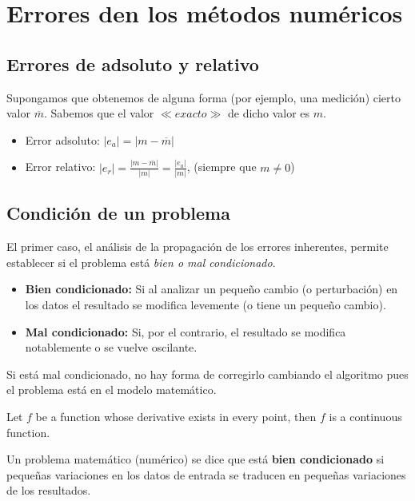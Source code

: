 \documentclass[../main.tex]{subfiles}
\begin{document}
\section{Errores den los métodos numéricos} 
    \subsection{Errores de adsoluto y relativo}
    Supongamos que obtenemos de alguna forma (por ejemplo, una medición) cierto valor $\overline{m}$. Sabemos que el valor $\ll  exacto \gg $ de dicho valor es $m$.
    \begin{itemize}
        \item Error adsoluto: $|e_a| = |m - \overline{m}|$
        \item Error relativo: $|e_r| = \frac{|m - \overline{m}|}{|m|} = \frac{|e_a|}{|m|}$, (siempre que $m \neq 0$)
    \end{itemize}        

    \subsection{Condición de un problema}
        El primer caso, el análisis de la propagación de los errores inherentes, permite establecer si el problema está \textit{bien o mal condicionado}.
        \begin{itemize}
            \item \textbf{Bien condicionado:} Si al analizar un pequeño cambio (o perturbación)
            en los datos el resultado se modifica levemente (o tiene un pequeño cambio).
            \item \textbf{Mal condicionado:} Si, por el contrario, el resultado se modifica notablemente o se vuelve oscilante.
        \end{itemize}

        Si está mal condicionado, no hay forma de corregirlo cambiando el algoritmo pues el problema está en el modelo matemático.

        \begin{theorem}
            Let \(f\) be a function whose derivative exists in every point, then \(f\) 
            is a continuous function.
        \end{theorem}

        \begin{definition}[]
            Un problema matemático (numérico) se dice que está \textbf{bien condicionado} si pequeñas variaciones en los datos de entrada se traducen en pequeñas variaciones de los resultados.
        \end{definition}
\end{document}

